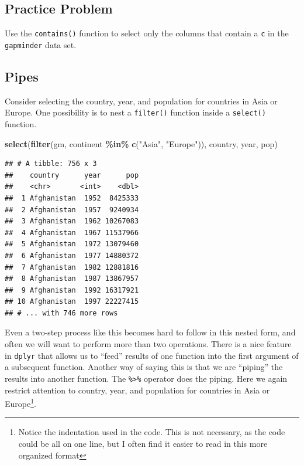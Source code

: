 \documentclass[
]{krantz}
\newenvironment{Shaded}{\begin{snugshade}}{\end{snugshade}}
\newcommand{\KeywordTok}[1]{\textcolor[rgb]{0.13,0.29,0.53}{\textbf{#1}}}
\newcommand{\NormalTok}[1]{#1}
\newcommand{\OperatorTok}[1]{\textcolor[rgb]{0.81,0.36,0.00}{\textbf{#1}}}
\newcommand{\StringTok}[1]{\textcolor[rgb]{0.31,0.60,0.02}{#1}}
\begin{document}
\hypertarget{ch6PP4}{%
\subsection{Practice Problem}\label{ch6PP4}}

Use the \texttt{contains()} function to select only the columns that contain a \texttt{c} in the \texttt{gapminder} data set.

\hypertarget{pipes}{%
\subsection{Pipes}\label{pipes}}

Consider selecting the country, year, and population for countries in Asia or Europe. One possibility is to nest a \texttt{filter()} function inside a \texttt{select()} function.

\begin{Shaded}
\begin{Highlighting}[]
\KeywordTok{select}\NormalTok{(}\KeywordTok{filter}\NormalTok{(gm, continent }\OperatorTok{\%in\%}\StringTok{ }\KeywordTok{c}\NormalTok{(}\StringTok{"Asia"}\NormalTok{, }\StringTok{"Europe"}\NormalTok{)), country, year, pop)}
\end{Highlighting}
\end{Shaded}

\begin{verbatim}
## # A tibble: 756 x 3
##    country      year      pop
##    <chr>       <int>    <dbl>
##  1 Afghanistan  1952  8425333
##  2 Afghanistan  1957  9240934
##  3 Afghanistan  1962 10267083
##  4 Afghanistan  1967 11537966
##  5 Afghanistan  1972 13079460
##  6 Afghanistan  1977 14880372
##  7 Afghanistan  1982 12881816
##  8 Afghanistan  1987 13867957
##  9 Afghanistan  1992 16317921
## 10 Afghanistan  1997 22227415
## # ... with 746 more rows
\end{verbatim}

Even a two-step process like this becomes hard to follow in this nested form, and often we will want to perform more than two operations. There is a nice feature in \texttt{dplyr} that allows us to ``feed'' results of one function into the first argument of a subsequent function. Another way of saying this is that we are ``piping'' the results into another function. The \texttt{\%\textgreater{}\%} operator does the piping. Here we again restrict attention to country, year, and population for countries in Asia or Europe\footnote{Notice the indentation used in the code. This is not necessary, as the code could be all on one line, but I often find it easier to read in this more organized format}.
\end{document}
